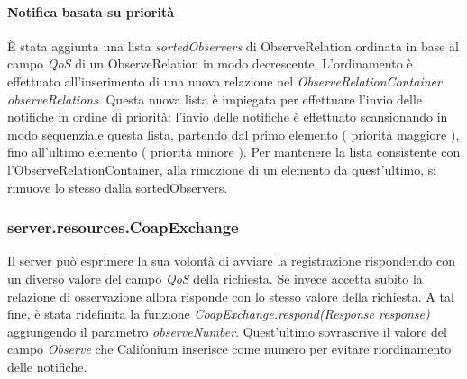 				\paragraph{Notifica basata su priorità}
				È stata aggiunta una lista \textit{sortedObservers} di ObserveRelation ordinata in base al campo \textit{QoS} di un ObserveRelation in modo decrescente. L’ordinamento è effettuato all’inserimento di una nuova relazione nel \textit{ObserveRelationContainer observeRelations}. Questa nuova lista è impiegata per effettuare l’invio delle notifiche in ordine di priorità: l'invio delle notifiche è effettuato scansionando in modo sequenziale questa lista, partendo dal primo elemento ( priorità maggiore ), fino all'ultimo elemento ( priorità minore ). Per mantenere la lista consistente con l’ObserveRelationContainer, alla rimozione di un elemento da quest’ultimo, si rimuove lo stesso dalla sortedObservers.\newline
				
				
				
				

			\subsubsection{server.resources.CoapExchange}
				Il server può esprimere la sua volontà di avviare la registrazione rispondendo con un diverso valore del campo \textit{QoS} della richiesta. Se invece accetta subito la relazione di osservazione allora risponde con lo stesso valore della richiesta. A tal fine, è stata ridefinita la funzione \textit{CoapExchange.respond(Response response)} aggiungendo il parametro \textit{observeNumber}. Quest'ultimo sovrascrive il valore del campo \textit{Observe} che Califonium inserisce come numero per evitare riordinamento delle notifiche.\newline
				

